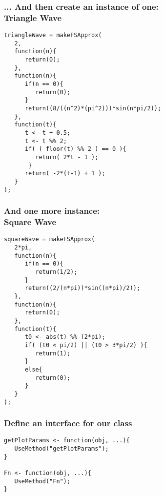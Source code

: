 \documentclass{beamer}
\begin{document}
\begin{frame}[fragile]
   \frametitle{... And then create an instance of one: \\Triangle Wave}
   \begin{center}
   \begin{minipage}{100mm}
   \begin{lstlisting}
triangleWave = makeFSApprox(
   2,
   function(n){
      return(0);
   },
   function(n){
      if(n == 0){
         return(0);
      }
      return((8/((n^2)*(pi^2)))*sin(n*pi/2));
   },
   function(t){
      t <- t + 0.5;
      t <- t %% 2;
      if( ( floor(t) %% 2 ) == 0 ){
         return( 2*t - 1 );
       }
      return( -2*(t-1) + 1 );
   }
);
   \end{lstlisting}
   \end{minipage}
   \end{center}
\end{frame}

\begin{frame}[fragile]
   \frametitle{And one more instance: \\Square Wave}
   \begin{center}
   \begin{minipage}{100mm}
   \begin{lstlisting}
squareWave = makeFSApprox(
   2*pi,
   function(n){
      if(n == 0){
         return(1/2);
      }
      return((2/(n*pi))*sin((n*pi)/2));
   },
   function(n){
      return(0);
   },
   function(t){
      t0 <- abs(t) %% (2*pi);
      if( (t0 < pi/2) || (t0 > 3*pi/2) ){
         return(1);
      }
      else{
         return(0);
      }
   }
);
   \end{lstlisting}
   \end{minipage}
   \end{center}
\end{frame}

\begin{frame}[fragile]
   \frametitle{Define an interface for our class}
   \begin{center}
   \begin{minipage}{100mm}
   \begin{lstlisting}
getPlotParams <- function(obj, ...){
   UseMethod("getPlotParams");
}

Fn <- function(obj, ...){
   UseMethod("Fn");
}
   \end{lstlisting}
   \end{minipage}
   \end{center}
\end{frame}
\end{document}
